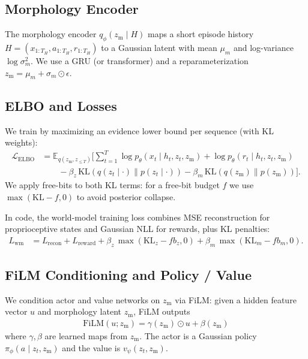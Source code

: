 \documentclass{article}
\begin{document}
\subsection{Morphology Encoder}
The morphology encoder $q_\phi(z_{\mathrm{m}} \mid H)$ maps a short episode history $H=(x_{1:T_H},a_{1:T_H},r_{1:T_H})$ to a Gaussian latent with mean $\mu_{m}$ and log-variance $\log\sigma^2_{m}$. We use a GRU (or transformer) and a reparameterization $z_{\mathrm{m}}=\mu_{m}+\sigma_{m}\odot\epsilon$.

\subsection{ELBO and Losses}
We train by maximizing an evidence lower bound per sequence (with KL weights):
\begin{align}
\mathcal{L}_{\mathrm{ELBO}} &= \mathbb{E}_{q(z_{\mathrm{m}}, z_{\le T})} \Big[ \sum_{t=1}^T \log p_\theta(x_t\mid h_t,z_t,z_{\mathrm{m}}) + \log p_\theta(r_t\mid h_t,z_t,z_{\mathrm{m}}) \\
&\qquad - \beta_z\,\mathrm{KL}(q(z_t\mid\cdot)\|p(z_t\mid\cdot)) - \beta_m\,\mathrm{KL}(q(z_{\mathrm{m}})\|p(z_{\mathrm{m}})) \Big].
\end{align}
We apply free-bits to both KL terms: for a free-bit budget $f$ we use $\max(\mathrm{KL}-f,0)$ to avoid posterior collapse.

In code, the world-model training loss combines MSE reconstruction for proprioceptive states and Gaussian NLL for rewards, plus KL penalties:
\begin{align}
L_{\mathrm{wm}} &= L_{\mathrm{recon}} + L_{\mathrm{reward}} + \beta_z\,\max(\mathrm{KL}_z - fb_z,0) + \beta_m\,\max(\mathrm{KL}_m - fb_m,0).
\end{align}

\subsection{FiLM Conditioning and Policy / Value}
We condition actor and value networks on $z_{\mathrm{m}}$ via FiLM: given a hidden feature vector $u$ and morphology latent $z_{\mathrm{m}}$, FiLM outputs
\begin{align}
\mathrm{FiLM}(u; z_{\mathrm{m}}) = \gamma(z_{\mathrm{m}}) \odot u + \beta(z_{\mathrm{m}})
\end{align}
where $\gamma,\beta$ are learned maps from $z_{\mathrm{m}}$. The actor is a Gaussian policy $\pi_\phi(a\mid z_t,z_{\mathrm{m}})$ and the value is $v_\psi(z_t,z_{\mathrm{m}})$.
\end{document}
